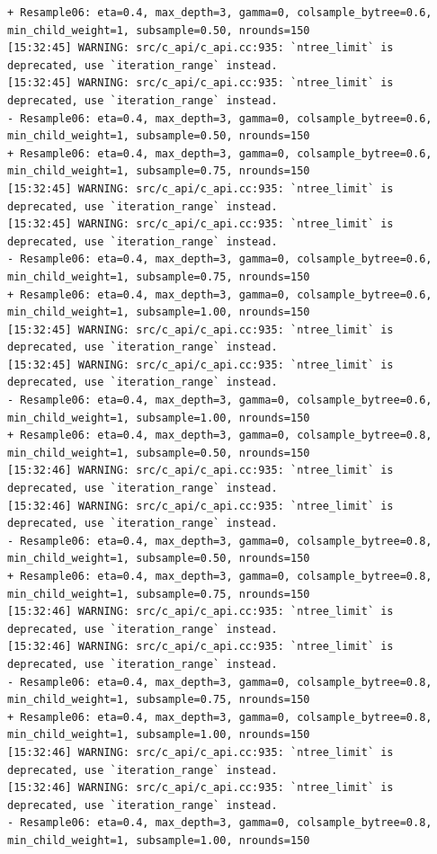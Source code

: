 \documentclass[
  letterpaper,
  DIV=11,
  numbers=noendperiod]{scrartcl}
\begin{document}
\begin{verbatim}
+ Resample06: eta=0.4, max_depth=3, gamma=0, colsample_bytree=0.6, min_child_weight=1, subsample=0.50, nrounds=150 
[15:32:45] WARNING: src/c_api/c_api.cc:935: `ntree_limit` is deprecated, use `iteration_range` instead.
[15:32:45] WARNING: src/c_api/c_api.cc:935: `ntree_limit` is deprecated, use `iteration_range` instead.
- Resample06: eta=0.4, max_depth=3, gamma=0, colsample_bytree=0.6, min_child_weight=1, subsample=0.50, nrounds=150 
+ Resample06: eta=0.4, max_depth=3, gamma=0, colsample_bytree=0.6, min_child_weight=1, subsample=0.75, nrounds=150 
[15:32:45] WARNING: src/c_api/c_api.cc:935: `ntree_limit` is deprecated, use `iteration_range` instead.
[15:32:45] WARNING: src/c_api/c_api.cc:935: `ntree_limit` is deprecated, use `iteration_range` instead.
- Resample06: eta=0.4, max_depth=3, gamma=0, colsample_bytree=0.6, min_child_weight=1, subsample=0.75, nrounds=150 
+ Resample06: eta=0.4, max_depth=3, gamma=0, colsample_bytree=0.6, min_child_weight=1, subsample=1.00, nrounds=150 
[15:32:45] WARNING: src/c_api/c_api.cc:935: `ntree_limit` is deprecated, use `iteration_range` instead.
[15:32:45] WARNING: src/c_api/c_api.cc:935: `ntree_limit` is deprecated, use `iteration_range` instead.
- Resample06: eta=0.4, max_depth=3, gamma=0, colsample_bytree=0.6, min_child_weight=1, subsample=1.00, nrounds=150 
+ Resample06: eta=0.4, max_depth=3, gamma=0, colsample_bytree=0.8, min_child_weight=1, subsample=0.50, nrounds=150 
[15:32:46] WARNING: src/c_api/c_api.cc:935: `ntree_limit` is deprecated, use `iteration_range` instead.
[15:32:46] WARNING: src/c_api/c_api.cc:935: `ntree_limit` is deprecated, use `iteration_range` instead.
- Resample06: eta=0.4, max_depth=3, gamma=0, colsample_bytree=0.8, min_child_weight=1, subsample=0.50, nrounds=150 
+ Resample06: eta=0.4, max_depth=3, gamma=0, colsample_bytree=0.8, min_child_weight=1, subsample=0.75, nrounds=150 
[15:32:46] WARNING: src/c_api/c_api.cc:935: `ntree_limit` is deprecated, use `iteration_range` instead.
[15:32:46] WARNING: src/c_api/c_api.cc:935: `ntree_limit` is deprecated, use `iteration_range` instead.
- Resample06: eta=0.4, max_depth=3, gamma=0, colsample_bytree=0.8, min_child_weight=1, subsample=0.75, nrounds=150 
+ Resample06: eta=0.4, max_depth=3, gamma=0, colsample_bytree=0.8, min_child_weight=1, subsample=1.00, nrounds=150 
[15:32:46] WARNING: src/c_api/c_api.cc:935: `ntree_limit` is deprecated, use `iteration_range` instead.
[15:32:46] WARNING: src/c_api/c_api.cc:935: `ntree_limit` is deprecated, use `iteration_range` instead.
- Resample06: eta=0.4, max_depth=3, gamma=0, colsample_bytree=0.8, min_child_weight=1, subsample=1.00, nrounds=150 

\end{verbatim}
\end{document}
